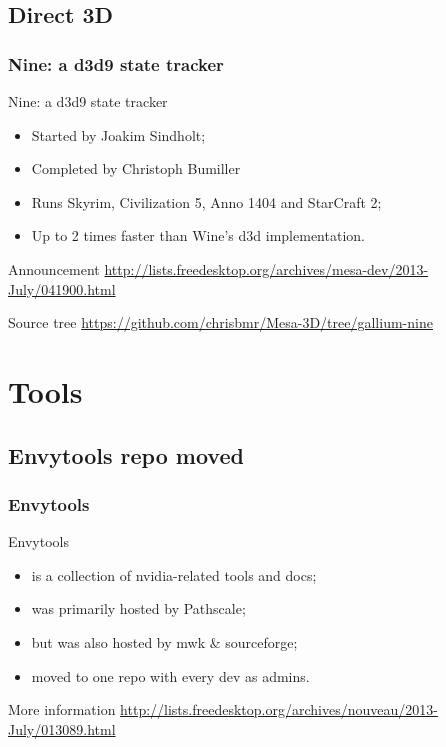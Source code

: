 \documentclass[11pt,english,compress]{beamer}
\begin{document}
\subsection{Direct 3D}

\begin{frame}
	\frametitle{Nine: a d3d9 state tracker}

	\begin{block}{Nine: a d3d9 state tracker}
		\begin{itemize}
			\item Started by Joakim Sindholt;
			\item Completed by Christoph Bumiller
			\item Runs Skyrim, Civilization 5, Anno 1404 and StarCraft 2;
			\item Up to 2 times faster than Wine's d3d implementation.
		\end{itemize}
	\end{block}

	\begin{block}{Announcement}
		\url{http://lists.freedesktop.org/archives/mesa-dev/2013-July/041900.html}
	\end{block}

	\begin{block}{Source tree}
		\url{https://github.com/chrisbmr/Mesa-3D/tree/gallium-nine}
	\end{block}
\end{frame}

\section{Tools}

\subsection{Envytools repo moved}
\begin{frame}
	\frametitle{Envytools}

	\begin{block}{Envytools}
		\begin{itemize}
			\item is a collection of nvidia-related tools and docs;
			\item was primarily hosted by Pathscale;
			\item but was also hosted by mwk \& sourceforge;
			\item moved to one repo with every dev as admins.
		\end{itemize}
	\end{block}

	\begin{block}{More information}
		\url{http://lists.freedesktop.org/archives/nouveau/2013-July/013089.html}
	\end{block}
\end{frame}
\end{document}

